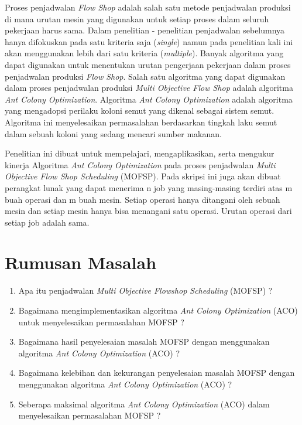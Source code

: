 \documentclass[a4paper,twoside]{article}
\begin{document}
Proses penjadwalan {\it Flow Shop} adalah salah satu metode penjadwalan produksi di mana urutan mesin yang digunakan untuk setiap proses dalam seluruh pekerjaan harus sama. Dalam penelitian - penelitian penjadwalan sebelumnya hanya difokuskan pada satu kriteria saja ({\it single}) namun pada penelitian kali ini akan menggunakan lebih dari satu kriteria ({\it multiple}). Banyak algoritma yang dapat digunakan untuk menentukan urutan  pengerjaan pekerjaan dalam proses penjadwalan produksi {\it Flow Shop}. Salah satu algoritma yang dapat digunakan dalam proses penjadwalan produksi {\it Multi Objective Flow Shop} adalah algoritma {\it Ant Colony Optimization}. Algoritma {\it Ant Colony Optimization} adalah algoritma yang mengadopsi perilaku koloni semut yang dikenal sebagai sistem semut. Algoritma ini menyelesaikan permasalahan berdasarkan tingkah laku semut dalam sebuah koloni yang sedang mencari sumber makanan.

Penelitian ini dibuat untuk mempelajari, mengaplikasikan, serta mengukur kinerja Algoritma {\it Ant Colony Optimization} pada proses penjadwalan {\it Multi Objective Flow Shop Scheduling} (MOFSP). Pada skripsi ini juga akan dibuat perangkat lunak yang dapat menerima n job yang masing-masing terdiri atas m buah operasi dan m buah mesin. Setiap operasi hanya ditangani oleh sebuah mesin dan setiap mesin hanya bisa menangani satu operasi. Urutan operasi dari setiap job adalah sama.


\section{Rumusan Masalah}
\begin{enumerate}[label=(\alph*)]
	\item Apa itu penjadwalan {\it Multi Objective Flowshop Scheduling} (MOFSP) ?
	\item Bagaimana mengimplementasikan algoritma {\it Ant Colony Optimization} (ACO) untuk menyelesaikan permasalahan MOFSP ?
	\item Bagaimana hasil penyelesaian masalah MOFSP dengan menggunakan algoritma {\it Ant Colony Optimization} (ACO) ?
	\item Bagaimana kelebihan dan kekurangan penyelesaian masalah MOFSP dengan menggunakan algoritma {\it Ant Colony Optimization} (ACO) ?
	\item Seberapa maksimal algoritma {\it Ant Colony Optimization} (ACO) dalam menyelesaikan permasalahan MOFSP ?

\end{enumerate}
\end{document}
